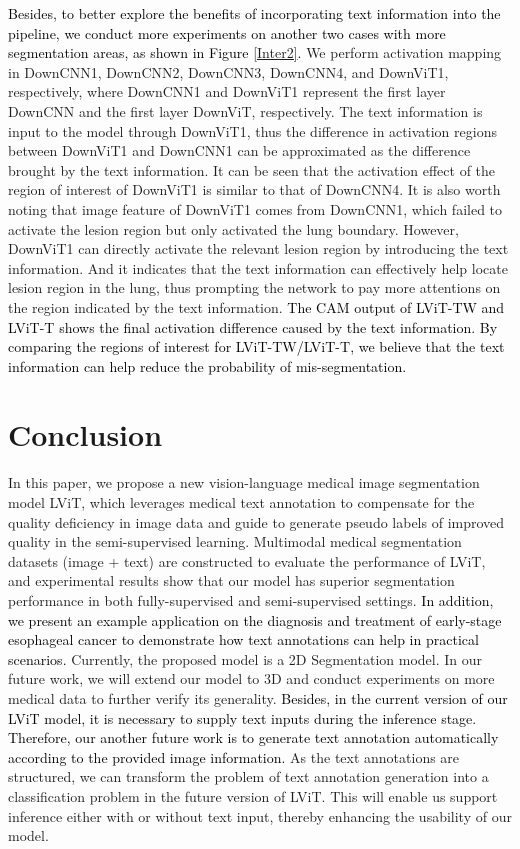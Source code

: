 \documentclass[lettersize,journal]{IEEEtran}
\begin{document}
\textcolor{black}{
Besides, to better explore the benefits of incorporating text information into the pipeline, we conduct more experiments on another two cases with more segmentation areas, as shown in Figure \ref{Inter2}.}
We perform activation mapping in DownCNN1, DownCNN2, DownCNN3, DownCNN4, and DownViT1, respectively, where DownCNN1 and DownViT1 represent the first layer DownCNN and the first layer DownViT, respectively. The text information is input to the model through DownViT1, thus the difference in activation regions between DownViT1 and DownCNN1 can be approximated as the difference brought by the text information. It can be seen that the activation effect of the region of interest of DownViT1 is similar to that of DownCNN4. It is also worth noting that image feature of DownViT1 comes from DownCNN1, which failed to activate the lesion region but only activated the lung boundary. However, DownViT1 can directly activate the relevant lesion region by introducing the text information. And it indicates that the text information can effectively help locate lesion region in the lung, thus prompting the network to pay more attentions on the region indicated by the text information. \textcolor{black}{The CAM output of LViT-TW and LViT-T shows the final activation difference caused by the text information. By comparing the regions of interest for LViT-TW/LViT-T, we believe that the text information can help reduce the probability of mis-segmentation.}

\section{Conclusion}
In this paper, we propose a new vision-language medical image segmentation model LViT, which leverages medical text annotation to compensate for the quality deficiency in image data and guide to generate pseudo labels of improved quality in the semi-supervised learning. Multimodal medical segmentation datasets (image + text) are constructed to evaluate the performance of LViT, and experimental results show that our model has superior segmentation performance in both fully-supervised and semi-supervised settings.
\textcolor{black}{In addition, we present an example application on the diagnosis and treatment of early-stage esophageal cancer to demonstrate how text annotations can help in practical scenarios.}
Currently, the proposed model is a 2D Segmentation model. In our future work, we will extend our model to 3D and conduct experiments on more medical data to further verify its generality.
\textcolor{black}{Besides, in the current version of our LViT model, it is necessary to supply text inputs during the inference stage. Therefore, our another future work is to generate text annotation automatically according to the provided image information.} As the text annotations are structured, we can transform the problem of text annotation generation into a classification problem in the future version of LViT. This will enable us support inference either with or without text input, thereby enhancing the usability of our model.



\end{document}
